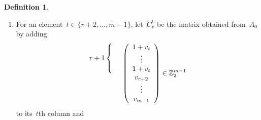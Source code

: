 \documentclass[11pt]{amsart}
\theoremstyle{plain}
\numberwithin{equation}{section}
\theoremstyle{definition}
\newtheorem{definition}[theorem]{Definition}
\newcommand{\Z}{\mathbb{Z}}
\begin{document}
\begin{definition}
\begin{enumerate}
\begin{equation}
\begin{pNiceArray}{c:c:c:c}[first-row,margin,code-for-first-row=\scriptstyle]
                    && v_{r+2}+1 & \\
                    M^v_{r+1} & I_{m-r-2}+M^v_{m-r-2}& \vdots &J_{m-r-2,1} \\
                    && v_{m-1}+1&
                \end{pNiceArray}
            \end{equation}
            by replacing its~$s$th row with
            \begin{equation}\label{eq:B_s0}
                \begin{pNiceArray}{c:cc}[first-row,margin,code-for-first-row=\scriptstyle] 
                    \begin{array}{*{6}{>{\scriptstyle}c}} \overline{1} & \cdots & \overline{r+1} & r+2 & \cdots & m-1 \end{array}   & m & \overline{m}\\
                    J_{1,m-1}& 1 & 0
                \end{pNiceArray} \in \Z_2^{m+1}.
            \end{equation}
        \item 
            For an element~$t \in \{r+2,\ldots,m-1\}$, let~$C_v^t$ be the matrix obtained from~$A_0$ by adding
            $$
                \begin{array}{@{}r@{\,}}
                    r+1 \left\{ \begin{array}{c} \vphantom{1+v_s}\\ \vphantom{\vdots}\\ \vphantom{1+v_s} \end{array} \right. \\
                    \vphantom{v_{r+2}}\\
                    \vphantom{\vdots}\\
                    \vphantom{v_{m-1}}
                \end{array}
                \left(
                    \begin{array}{c}
                        1+v_t\\
                        \vdots\\
                        1+v_t\\
                        v_{r+2}\\
                        \vdots\\
                        v_{m-1}
                    \end{array}
                \right) \in \Z^{m-1}_2
            $$
            to its~$t$th column and

\end{enumerate}
\end{definition}
\end{document}
